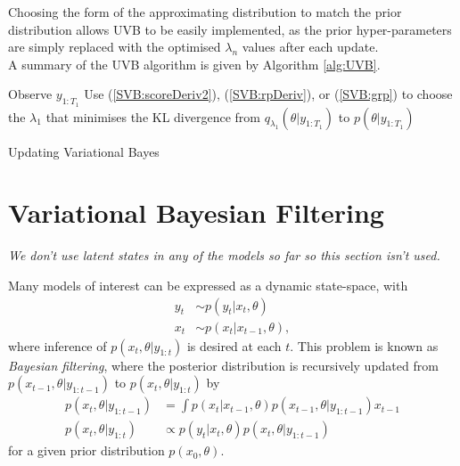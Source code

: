\documentclass[
12pt, %
onehalfspacing, %
nohyperref, %
headsepline, %
chapterinoneline, %
]{MastersDoctoralThesis} %
\begin{document}
Choosing the form of the approximating distribution to match the prior distribution allows UVB to be easily implemented, as the prior hyper-parameters are simply replaced with the optimised $\lambda_n$ values after each update.
\\

A summary of the UVB algorithm is given by Algorithm \ref{alg:UVB}.
\\

\begin{algorithm}[H]
 Observe $y_{1:T_1}$\;
 Use (\ref{SVB:scoreDeriv2}), (\ref{SVB:rpDeriv}), or (\ref{SVB:grp}) to choose the $\lambda_1$ that minimises the KL divergence from $q_{\lambda_1}(\theta | y_{1:T_1})$ to $p(\theta | y_{1:T_1})$ \;
 \caption{Updating Variational Bayes}
  \label{alg:UVB}
\end{algorithm}

\section{Variational Bayesian Filtering} \label{sec:UVBVBF}

\textit{We don't use latent states in any of the models so far so this section isn't used.}

Many models of interest can be expressed as a dynamic state-space, with
\begin{align}
y_t &\sim p(y_t | x_{t}, \theta) \label{VBF:measure} \\
x_t &\sim p(x_t | x_{t-1}, \theta) \label{VBF:transition} ,
\end{align}
where inference of $p(x_t, \theta | y_{1:t})$ is desired at each $t$. This problem is known as \textit{Bayesian filtering}, where the posterior distribution is recursively updated from $p(x_{t-1}, \theta | y_{1:t-1})$ to $p(x_t, \theta | y_{1:t})$ by
\begin{align}
p(x_t, \theta | y_{1:t-1}) &= \int p(x_t | x_{t-1}, \theta) p(x_{t-1}, \theta | y_{1:t-1})x_{t-1} \label{VBF:marginalise} \\
p(x_t, \theta | y_{1:t}) &\propto p(y_t | x_t, \theta) p(x_t, \theta | y_{1:t-1}) \label{VBF:update}
\end{align}
for a given prior distribution $p(x_0, \theta)$. 
\\
\end{document}
